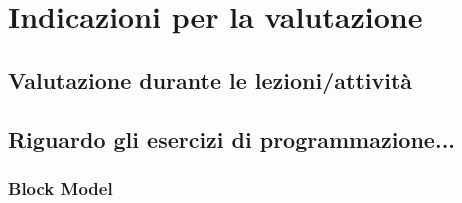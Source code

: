 \chapter{Indicazioni per la valutazione}

\section{Valutazione durante le lezioni/attività}

\section{Riguardo gli esercizi di programmazione...}

\subsection{Block Model}

